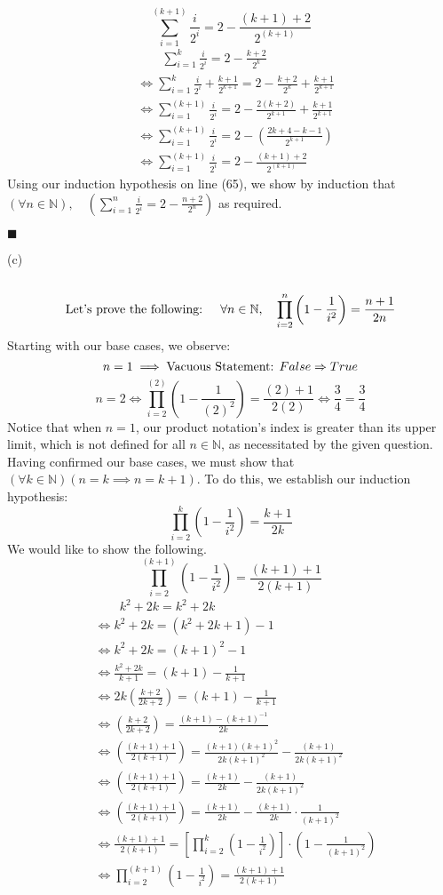 \documentclass[12pt]{article}
\begin{document}
$$\boxed{\sum_{i=1}^{(k+1)}\frac{i}{2^i}=2-\frac{(k+1)+2}{2^{(k+1)}}}$$
\begin{align}
&\quad\quad \sum_{i=1}^{k}\frac{i}{2^i}=2-\frac{k+2}{2^k}\\
&\iff \sum_{i=1}^{k}\frac{i}{2^i}+\frac{k+1}{2^{k+1}}=2-\frac{k+2}{2^k}+\frac{k+1}{2^{k+1}}\\
&\iff \sum_{i=1}^{(k+1)}\frac{i}{2^i}=2-\frac{2(k+2)}{2^{k+1}}+\frac{k+1}{2^{k+1}}\\
&\iff \sum_{i=1}^{(k+1)}\frac{i}{2^i}=2-\left(\frac{2k+4-k-1}{2^{k+1}}\right)\\
&\iff \sum_{i=1}^{(k+1)}\frac{i}{2^i}=2-\frac{(k+1)+2}{2^{(k+1)}}
\end{align}
Using our induction hypothesis on line (65), we show by induction that $(\forall n \in \mathbb{N}), \quad (\sum_{i=1}^{n}\frac{i}{2^i}=2-\frac{n+2}{2^n})$ as required.
\begin{flushright}
$\blacksquare$
\end{flushright}
(c)\\\\
$$\textnormal{Let's prove the following: }\quad \forall n \in \mathbb{N}, \quad \prod_{i=2}^{n}\left(1-\frac{1}{i^2}\right)=\frac{n+1}{2n}$$
Starting with our base cases, we observe: 
$$n=1 \implies \textnormal{Vacuous Statement: } False \Rightarrow True$$
$$n=2 \iff \prod_{i=2}^{(2)}\left(1-\frac{1}{(2)^2}\right)=\frac{(2)+1}{2(2)} \iff \frac{3}{4} = \frac{3}{4}$$
Notice that when $n=1$, our product notation's index is greater than its upper limit, which is not defined for all $n \in \mathbb{N}$, as necessitated by the given question. Having confirmed our base cases, we must show that $(\forall k \in \mathbb{N}) (n = k \implies n=k+1)$. To do this, we establish our induction hypothesis: $$\prod_{i=2}^{k}\left(1-\frac{1}{i^2}\right)=\frac{k+1}{2k}$$
We would like to show the following.
$$\boxed{\prod_{i=2}^{(k+1)}\left(1-\frac{1}{i^2}\right)=\frac{(k+1)+1}{2(k+1)}}$$
\begin{align}
&\quad\quad k^2+2k=k^2+2k\\
&\iff k^2+2k=(k^2+2k+1)-1\\
&\iff k^2+2k=(k+1)^2-1\\
&\iff \frac{k^2+2k}{k+1}=(k+1)-\frac{1}{k+1}\\
&\iff 2k\left(\frac{k+2}{2k+2}\right)=(k+1)-\frac{1}{k+1}\\
&\iff \left(\frac{k+2}{2k+2}\right)=\frac{(k+1)-(k+1)^{-1}}{2k}\\
&\iff \left(\frac{(k+1)+1}{2(k+1)}\right)=\frac{(k+1)(k+1)^2}{2k(k+1)^2}-\frac{(k+1)}{2k(k+1)^2}\\
&\iff \left(\frac{(k+1)+1}{2(k+1)}\right)=\frac{(k+1)}{2k}-\frac{(k+1)}{2k(k+1)^2}\\
&\iff \left(\frac{(k+1)+1}{2(k+1)}\right)=\frac{(k+1)}{2k}-\frac{(k+1)}{2k}\cdot \frac{1}{(k+1)^2}\\
&\iff \frac{(k+1)+1}{2(k+1)}=\left[\prod_{i=2}^{k}\left(1-\frac{1}{i^2}\right)\right]\cdot\left(1-\frac{1}{(k+1)^2}\right)\\
&\iff \prod_{i=2}^{(k+1)}\left(1-\frac{1}{i^2}\right)=\frac{(k+1)+1}{2(k+1)}
\end{align}
\end{document}
